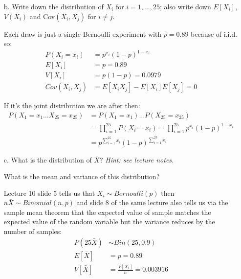 \documentclass{article}
\newcommand{\1}{\mathbf{1}}
\begin{document}
\begin{itemize} 
    \item[b.] Write down the distribution of $X_i$ for $i=1,\ldots ,25$; also write down $E[X_i]$, $V(X_i)$ and Cov$(X_i,X_j)$ for $i\neq j$.
    
    Each draw is just a single Bernoulli experiment with $p=0.89$ because of i.i.d. so:
    \begin{align*}
        P(X_i=x_i) &= p^{x_i}(1-p)^{1-{x_i}} \\
        E[X_i] &= p = 0.89 \\
        V[X_i] &= p(1-p) = 0.0979 \\
        Cov(X_i, X_j) &= E[X_iX_j] - E[X_i]E[X_j] = 0
    \end{align*}
    
    If it's the joint distribution we are after then:
    \begin{align*}
        P(X_1=x_1 \hdots X_{25}=x_{25}) &= P(X_1=x_1)\hdots P(X_{25}=x_{25}) \\
        &= \prod_{i=1}^{25} P(X_i=x_i) = \prod_{i=1}^{25} p^{x_i}(1-p)^{1-x_i} \\
        &= p^{\sum_{i=1}^{25} x_i}(1-p)^{\sum_{i=1}^{25} x_i}
    \end{align*}
    
    \newpage
    \item[c.] What is the distribution of $\bar{X}$? {\it Hint: see lecture notes.}\par
    What is the mean and variance of this distribution?
    
    Lecture 10 slide 5 tells us that $X_i\sim Bernoulli(p)$ then $n\bar X \sim Binomial(n, p)$ and slide 8 of the same lecture also tells us via the sample mean theorem that the expected value of sample matches the expected value of the random variable but the variance reduces by the number of samples:
    \begin{align*}
        P(25\bar X) &\sim Bin(25, 0.9) \\
        E[\bar X] &= p = 0.89 \\
        V[\bar X] &= \frac{V[X_i]}{n} = 0.003916 \\
    \end{align*}
    
    
    

\end{itemize}
\end{document}
